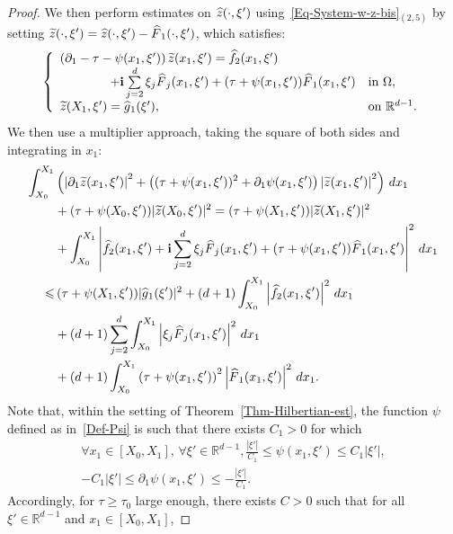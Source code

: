 \documentclass[10pt]{amsart}
\theoremstyle{definition}\newtheorem{defi}[theo]{Definition}\newtheorem{rema}[theo]{Remark}\newtheorem{exam}[theo]{Example}\newtheorem{exem}[theo]{Example}\newtheorem{nota}[theo]{Notation}
\newcommand*\R{\mathbb{R}}
\renewcommand{\i}{\mathbf{i}}
\renewcommand{\leq}{\leqslant}
\renewcommand{\geq}{\geqslant}
\renewcommand{\tilde}{\widetilde}
\renewcommand{\hat}{\widehat}
\let\oldtilde\tilde
\renewcommand*{\tilde}[1]{\mathchoice{\widetilde{#1}}{\widetilde{#1}}{\oldtilde{#1}}{\oldtilde{#1}}}
\let\oldhat\hat
\renewcommand*{\hat}[1]{\mathchoice{\widehat{#1}}{\widehat{#1}}{\oldhat{#1}}{\oldhat{#1}}}
\let\oldforall\forall
\renewcommand*{\forall}{\mathrel{\oldforall}}
\begin{document}
\begin{proof}
We then perform estimates on $\hat z(\cdot, \xi') $ using~\eqref{Eq-System-w-z-bis}$_{(2,5)}$ by setting $\tilde z(\cdot, \xi') = \hat z(\cdot, \xi') - \hat F_1(\cdot, \xi')$, which satisfies:
\begin{equation*}\label{Eq-tilde-zs}
\left\{
\begin{array}{ll}
\left(\partial_1-\tau-\psi(x_1,\xi') \right)\tilde {z}(x_1,\xi')=\widehat f_2(x_1, \xi') \\
\qquad\qquad+ \i \sum\limits_{j=2}^d \xi_j \hat F_j(x_1, \xi') + (\tau + \psi(x_1, \xi')) \hat F_1(x_1, \xi') & \text{in } \Omega,
\\
\tilde z(X_1, \xi') = \hat g_1 (\xi'), &\text{on } \R^{d-1}.
\end{array}
\right.
\end{equation*}
We then use a multiplier approach, taking the square of both sides and integrating in $x_1$:
\begingroup
\allowdisplaybreaks
\begin{align*}
\int_{X_0}^{X_1}& \left(\left|\partial_1 \tilde z(x_1, \xi')\right|^2 + \left((\tau + \psi(x_1, \xi'))^2 + \partial_1 \psi(x_1, \xi') \right) \left|\tilde z(x_1, \xi')\right|^2\right) \, dx_1
\\
& +(\tau + \psi(X_0, \xi')) |\tilde z(X_0, \xi')|^2 = (\tau + \psi(X_1, \xi')) |\tilde z(X_1, \xi')|^2
\\
& + \int_{X_0}^{X_1} \left| \widehat f_2(x_1, \xi') + \i \sum_{j=2}^d \xi_j \hat F_j(x_1, \xi') + (\tau + \psi(x_1, \xi')) \hat F_1(x_1, \xi')\right|^2 \, dx_1
\\
\leq&\, (\tau + \psi(X_1, \xi')) |\hat g_1(\xi')|^2 + (d+1) \int_{X_0}^{X_1} \left| \widehat f_2(x_1, \xi') \right|^2 \, dx_1
\\
&+ (d+1) \sum_{j=2}^d \int_{X_0}^{X_1} \left|\xi_j \hat F_j(x_1, \xi')\right|^2 \, dx_1\\
&+ (d+1) \int_{X_0}^{X_1} \left(\tau + \psi(x_1, \xi')\right)^2 \left|\hat F_1(x_1, \xi') \right|^2 \, dx_1.
\end{align*}
\endgroup
Note that, within the setting of Theorem~\ref{Thm-Hilbertian-est}, the function $\psi$ defined as in~\eqref{Def-Psi} is such that there exists $C_1 >0$ for which
\begin{multline}\label{Equivalences-Psi-x-xi-prime}
\forall x_1 \in [X_0,X_1],\, \forall \xi' \in \R^{d-1},
\frac{|\xi'| }{C_1} \leq \psi(x_1, \xi')
\leq C_1 |\xi'|,\\
 - C_1 |\xi'| \leq \partial_1 \psi(x_1, \xi') \leq - \frac{|\xi'| }{C_1}.
\end{multline}
Accordingly, for $\tau \geq \tau_0$ large enough, there exists $C>0$ such that for all $\xi' \in \R^{d-1}$ and $x_1 \in [X_0, X_1]$,

\end{proof}
\end{document}
